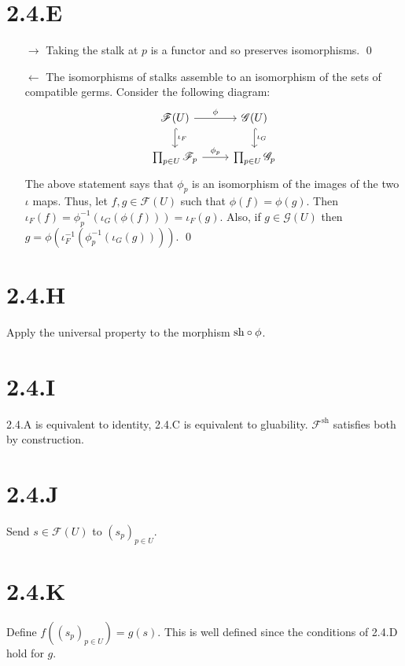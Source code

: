 \documentclass{article}
\begin{document}
\section*{2.4.E}
\begin{itemize}
    \item[$\rightarrow$] Taking the stalk at $p$ is a functor and so preserves isomorphisms. \qed
    \item[$\leftarrow$] The isomorphisms of stalks assemble to an isomorphism of the sets of
          compatible germs. Consider the following diagram:
          \[
              \begin{tikzcd}
                  \mathscr{F}(U) \ar[r, "\phi"] \ar[d, hook, "\iota_F"]
                   & \mathscr{G}(U) \ar[d, hook, "\iota_G"] \\
                  \prod_{p \in U} \mathscr{F}_p \ar[r, "\phi_p"]
                   & \prod_{p \in U} \mathscr{G}_p
              \end{tikzcd}
          \]
          The above statement says that $\phi_p$ is an isomorphism of the images of the two
          $\iota$ maps. Thus, let $f, g \in \mathscr{F}(U)$ such that $\phi(f)=\phi(g)$.
          Then $\iota_F(f)=\phi^{-1}_p(\iota_G(\phi(f)))=\iota_F(g)$. Also,
          if $g \in \mathscr{G}(U)$ then $g=\phi(\iota_F^{-1}(\phi_p^{-1}(\iota_G(g))))$. \qed
\end{itemize}

\section*{2.4.H}
Apply the universal property to the morphism $\text{sh} \circ \phi$.

\section*{2.4.I}
2.4.A is equivalent to identity, 2.4.C is equivalent to gluability. $\mathscr{F}^{\text{sh}}$
satisfies both by construction.

\section*{2.4.J}
Send $s \in \mathscr{F}(U)$ to $(s_p)_{p \in U}$.

\section*{2.4.K}
Define $f((s_p)_{p \in U})=g(s)$. This is well defined since the conditions of 2.4.D hold for
$g$.
\end{document}
